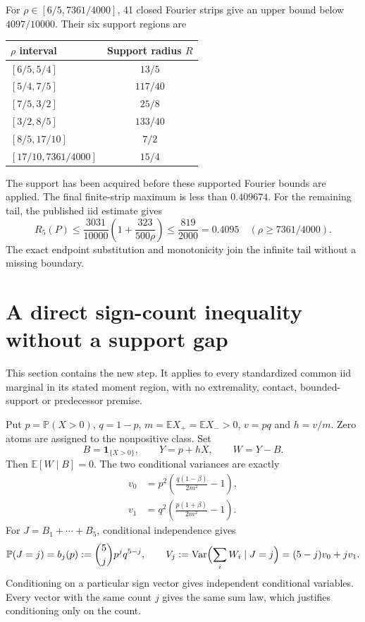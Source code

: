 \documentclass[11pt,a4paper]{article}
\theoremstyle{definition}
\newcommand{\E}{\mathbb E}
\newcommand{\Pp}{\mathbb P}
\newcommand{\ind}{\mathbf 1}
\begin{document}
For $\rho\in[6/5,7361/4000]$, 41 closed Fourier strips give an upper bound
below $4097/10000$. Their six support regions are
\begin{center}
\begin{tabular}{@{}lc@{}}\toprule
$\rho$ interval & Support radius $R$\\\midrule
$[6/5,5/4]$ & $13/5$\\
$[5/4,7/5]$ & $117/40$\\
$[7/5,3/2]$ & $25/8$\\
$[3/2,8/5]$ & $133/40$\\
$[8/5,17/10]$ & $7/2$\\
$[17/10,7361/4000]$ & $15/4$\\\bottomrule
\end{tabular}
\end{center}
The support has been acquired before these supported Fourier bounds are
applied. The final finite-strip maximum is less than $0.409674$.
For the remaining tail, the published iid estimate gives
\[
 R_5(P)\le\frac{3031}{10000}\left(1+\frac{323}{500\rho}\right)
 \le\frac{819}{2000}=0.4095\quad(\rho\ge7361/4000).
\]
The exact endpoint substitution and monotonicity join the infinite tail
without a missing boundary.

\section{A direct sign-count inequality without a support gap}
This section contains the new step. It applies to every standardized common
iid marginal in its stated moment region, with no extremality, contact,
bounded-support or predecessor premise.

Put $p=\Pp(X>0)$, $q=1-p$, $m=\E X_+=\E X_->0$, $v=pq$ and $h=v/m$.
Zero atoms are assigned to the nonpositive class. Set
\[
 B=\ind_{\{X>0\}},\qquad Y=p+hX,\qquad W=Y-B.
\]
Then $\E[W\mid B]=0$. The two conditional variances are exactly
\begin{align}
 v_0&=p^2\left(\frac{q(1-\beta)}{2m^2}-1\right),\label{eq:v0}\\
 v_1&=q^2\left(\frac{p(1+\beta)}{2m^2}-1\right).\label{eq:v1}
\end{align}
For $J=B_1+\cdots+B_5$, conditional independence gives
\[
 \Pp(J=j)=b_j(p):=\binom5j p^jq^{5-j},\qquad
 V_j:=\operatorname{Var}\Bigl(\sum_iW_i\mid J=j\Bigr)=(5-j)v_0+jv_1.
\]
Conditioning on a particular sign vector gives independent conditional
variables. Every vector with the same count $j$ gives the same sum law,
which justifies conditioning only on the count.
\end{document}
